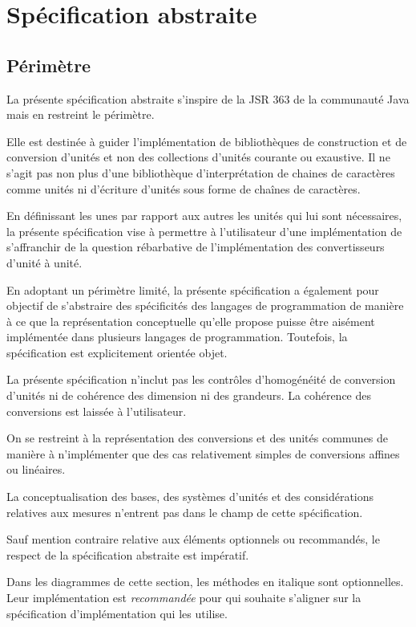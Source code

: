 \documentclass[a4paper,draft,twoside,10pt]{article}
\begin{document}
\section{Spécification abstraite}

\subsection{Périmètre}

La présente spécification abstraite s'inspire de la JSR 363 de la communauté Java mais en restreint le périmètre.

Elle est destinée à guider l'implémentation de bibliothèques de construction et de conversion d'unités et non des
collections d'unités courante ou exaustive. Il ne s'agit pas non plus d'une bibliothèque d'interprétation de chaines de
caractères comme unités ni d'écriture d'unités sous forme de chaînes de caractères.

En définissant les unes par rapport aux autres les unités qui lui sont nécessaires, la présente spécification vise à
permettre à l'utilisateur d'une implémentation de s'affranchir de la question rébarbative de l'implémentation des
convertisseurs d'unité à unité.

En adoptant un périmètre limité, la présente spécification a également pour objectif de s'abstraire des spécificités des
langages de programmation de manière à ce que la représentation conceptuelle qu'elle propose puisse être aisément
implémentée dans plusieurs langages de programmation. Toutefois, la spécification est explicitement orientée objet.

La présente spécification n'inclut pas les contrôles d'homogénéité de conversion d'unités ni de cohérence des dimension
ni des grandeurs. La cohérence des conversions est laissée à l'utilisateur.

On se restreint à la représentation des conversions et des unités communes de manière à n'implémenter que des cas
relativement simples de conversions affines ou linéaires.

La conceptualisation des bases, des systèmes d'unités et des considérations relatives aux mesures n'entrent pas dans
le champ de cette spécification.

Sauf mention contraire relative aux éléments optionnels ou recommandés, le respect de la spécification abstraite est
impératif.

Dans les diagrammes de cette section, les méthodes en italique sont optionnelles. Leur implémentation est
\emph{recommandée} pour qui souhaite s'aligner sur la spécification d'implémentation qui les utilise.
\end{document}
